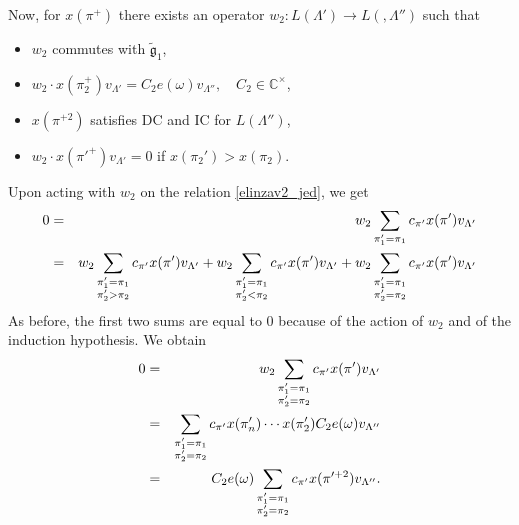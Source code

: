 \documentclass[a4paper, 10pt,oneside]{amsart}
\begin{document}
Now, for $x(\pi^+)$ there exists an operator $w_2:L(\Lambda')\to L(,\Lambda'')$
such that
\begin{itemize}
\item $w_2$ commutes with ${\tilde{{\mathfrak g}}}_1$,
\item $w_2\cdot x(\pi_2^+) v_{\Lambda'} = C_2 e(\omega) v_{\Lambda''},\quad C_2\in{{\mathbb C}}^\times$,
\item $x(\pi^{+2})$ satisfies DC and IC for $L(\Lambda'')$,
\item $w_2\cdot x(\pi'^+)v_{\Lambda'}=0$ \quad if \quad $x(\pi_2')>x(\pi_2)$.
\end{itemize}
Upon acting with $w_2$  on the relation \eqref{elinzav2_jed}, we get
\begin{eqnarray*}
0 & = & w_2 \sum_{\pi_1'=\pi_1} c_{\pi'}x(\pi') v_{\Lambda'}\\
 & = & w_2 \sum_{\begin{subarray}{c} \pi_1'=\pi_1\\ \pi_2'>\pi_2 \end{subarray}}c_{\pi'}x(\pi') v_{\Lambda'} +w_2
 \sum_{\begin{subarray}{c} \pi_1'=\pi_1 \\ \pi_2'<\pi_2\end{subarray}}c_{\pi'}x(\pi')
 v_{\Lambda'}+ w_2 \sum_{\begin{subarray}{c} \pi_1'=\pi_1 \\ \pi_2'=\pi_2\end{subarray}}c_{\pi'}x(\pi')
 v_{\Lambda'}
\end{eqnarray*}
As before, the first two sums are equal to $0$ because of the action of $w_2$ and of the induction hypothesis. We obtain
\begin{eqnarray*}
0 & = & w_2 \sum_{\begin{subarray}{c} \pi_1'=\pi_1 \\ \pi_2'=\pi_2\end{subarray}}c_{\pi'}x(\pi')v_{\Lambda'} \\
  & = & \sum_{\begin{subarray}{c} \pi_1'=\pi_1 \\ \pi_2'=\pi_2\end{subarray}}c_{\pi'}x(\pi_n')\cdots x(\pi_2') C_2 e(\omega) v_{\Lambda''}\\
 & = & C_2 e(\omega) \sum_{\begin{subarray}{c} \pi_1'=\pi_1 \\ \pi_2'=\pi_2\end{subarray}}c_{\pi'}x(\pi'^{+2}) v_{\Lambda''}.
\end{eqnarray*}
\end{document}
